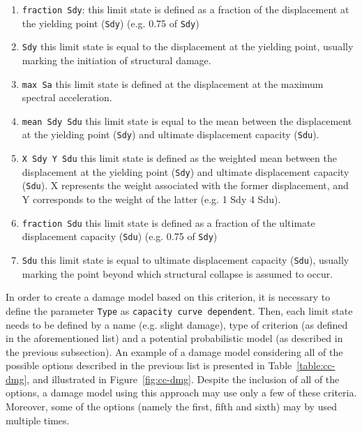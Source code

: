 \begin{enumerate}
 \item \verb=fraction Sdy=: this limit state is defined as a fraction of the displacement at the yielding point (\verb=Sdy=) (e.g. 0.75 of \verb=Sdy=)
 \item \verb=Sdy= this limit state is equal to the displacement at the yielding point, usually marking the initiation of structural damage.
 \item \verb=max Sa= this limit state is defined at the displacement at the maximum spectral acceleration.
 \item \verb=mean Sdy Sdu= this limit state is equal to the mean between the displacement at the yielding point (\verb=Sdy=) and ultimate displacement capacity (\verb=Sdu=).
 \item \verb=X Sdy Y Sdu= this limit state is defined as the weighted mean between the displacement at the yielding point (\verb=Sdy=) and ultimate displacement capacity (\verb=Sdu=). X represents the weight associated with the former displacement, and Y corresponds to the weight of the latter (e.g. 1 Sdy 4 Sdu).
 \item \verb=fraction Sdu= this limit state is defined as a fraction of the ultimate displacement capacity (\verb=Sdu=) (e.g. 0.75 of \verb=Sdy=)
 \item \verb=Sdu= this limit state is equal to ultimate displacement capacity (\verb=Sdu=), usually marking the point beyond which structural collapse is assumed to occur.\\
\end{enumerate}

In order to create a damage model based on this criterion, it is necessary to define the parameter \verb=Type= as \verb=capacity curve dependent=. Then, each limit state needs to be defined by a name (e.g. slight damage), type of criterion (as defined in the aforementioned list) and a potential probabilistic model (as described in the previous subsection). An example of a damage model considering all of the possible options described in the previous list is presented in Table~\ref{table:cc-dmg}, and illustrated in Figure~\ref{fig:cc-dmg}. Despite the inclusion of all of the options, a damage model using this approach may use only a few of these criteria. Moreover, some of the options (namely the first, fifth and sixth) may by used multiple times.

